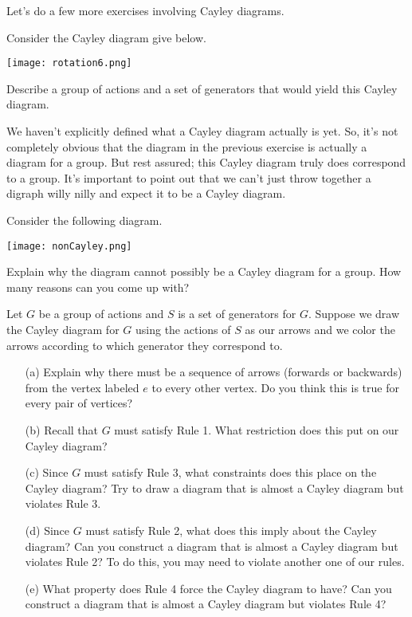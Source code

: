 Let's do a few more exercises involving Cayley diagrams.

\begin{exercise}\label{exer:intro_R6}
Consider the Cayley diagram give below.
\begin{center}
\texttt{[image: rotation6.png]}
\end{center}
Describe a group of actions and a set of generators that would yield this Cayley diagram.
\end{exercise}

We haven't explicitly defined what a Cayley diagram actually is yet.  So, it's not completely obvious that the diagram in the previous exercise is actually a diagram for a group.  But rest assured; this Cayley diagram truly does correspond to a group.  It's important to point out that we can't just throw together a digraph willy nilly and expect it to be a Cayley diagram.

\begin{exercise}
Consider the following diagram.
\begin{center}
\texttt{[image: nonCayley.png]}
\end{center}
Explain why the diagram cannot possibly be a Cayley diagram for a group.  How many reasons can you come up with?
\end{exercise}

\begin{exercise}\label{exer:properties_Cayley}
Let \(G\) be a group of actions and \(S\) is a set of generators for \(G\). Suppose we draw the Cayley diagram for \(G\) using the actions of \(S\) as our arrows and we color the arrows according to which generator they correspond to.  
\begin{enumerate}
\item[(a)] Explain why there must be a sequence of arrows (forwards or backwards) from the vertex labeled \(e\) to every other vertex.  Do you think this is true for every pair of vertices?
\item[(b)] Recall that \(G\) must satisfy Rule 1.  What restriction does this put on our Cayley diagram?
\item[(c)] Since \(G\) must satisfy Rule 3, what constraints does this place on the Cayley diagram?  Try to draw a diagram that is almost a Cayley diagram but violates Rule 3.
\item[(d)] Since \(G\) must satisfy Rule 2, what does this imply about the Cayley diagram?  Can you construct a diagram that is almost a Cayley diagram but violates Rule 2?  To do this, you may need to violate another one of our rules.
\item[(e)] What property does Rule 4 force the Cayley diagram to have?  Can you construct a diagram that is almost a Cayley diagram but violates Rule 4? 
\end{enumerate}
\end{exercise}

